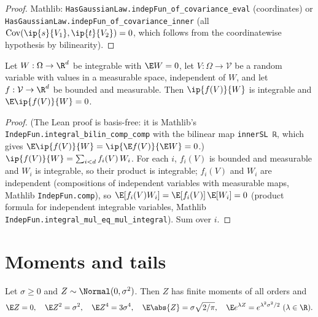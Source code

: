 \begin{proof}
\leanok
{}
Mathlib: \texttt{HasGaussianLaw.indepFun\_of\_covariance\_eval} (coordinates) or
\texttt{HasGaussianLaw.indepFun\_of\_covariance\_inner} (all $\operatorname{Cov}(\ip{s}{V_1},
\ip{t}{V_2}) = 0$, which follows from the coordinatewise hypothesis by bilinearity).
\end{proof}

\begin{lemma}
\label{lem:indep_integral_zero}
\leanok
Let $W : \Omega \to \R^d$ be integrable with $\E W = 0$, let $V : \Omega \to \mathcal V$ be a
random variable with values in a measurable space, independent of $W$, and let
$f : \mathcal V \to \R^d$ be bounded and measurable. Then $\ip{f(V)}{W}$ is integrable and
$\E\ip{f(V)}{W} = 0$.
\end{lemma}

\begin{proof}
\leanok
(The Lean proof is basis-free: it is Mathlib's \texttt{IndepFun.integral\_bilin\_comp\_comp}
with the bilinear map \texttt{innerSL ℝ}, which gives $\E\ip{f(V)}{W} = \ip{\E f(V)}{\E W} = 0$.)
$\ip{f(V)}{W} = \sum_{i<d} f_i(V)\,W_i$. For each $i$, $f_i(V)$ is bounded and measurable and
$W_i$ is integrable, so their product is integrable; $f_i(V)$ and $W_i$ are independent
(compositions of independent variables with measurable maps, Mathlib \texttt{IndepFun.comp}),
so $\E[f_i(V)W_i] = \E[f_i(V)]\,\E[W_i] = 0$ (product formula for independent integrable
variables, Mathlib \texttt{IndepFun.integral\_mul\_eq\_mul\_integral}). Sum over $i$.
\end{proof}

\section{Moments and tails}
\label{sec:pre_gaussian_moments}

\begin{lemma}\label{lem:gauss_1d_moments}
Let $\sigma \ge 0$ and $Z \sim \Normal(0,\sigma^2)$. Then $Z$ has finite moments of all
orders and
\[
  \E Z = 0,\quad \E Z^2 = \sigma^2,\quad \E Z^4 = 3\sigma^4,\quad
  \E\abs{Z} = \sigma\sqrt{2/\pi},\quad \E e^{\lambda Z} = e^{\lambda^2\sigma^2/2}\ (\lambda\in\R).
\]
\end{lemma}

